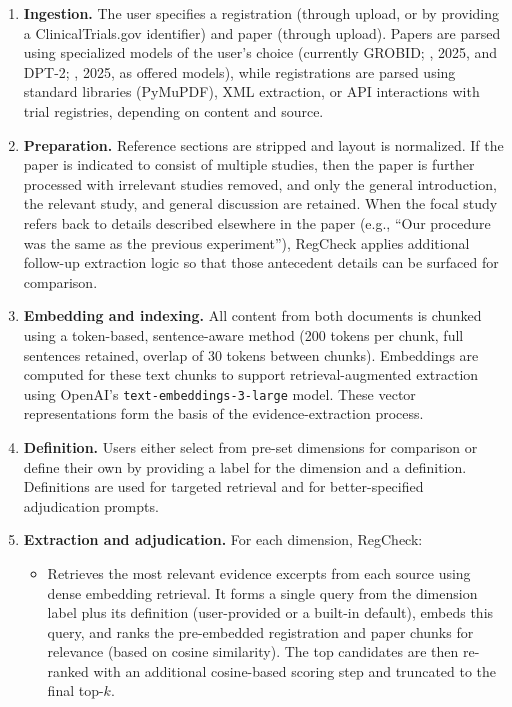 \documentclass{article}
\begin{document}
\begin{enumerate}
\item \textbf{Ingestion.} The user specifies a registration (through upload, or by providing a ClinicalTrials.gov identifier) and paper (through upload). Papers are parsed using specialized models of the user's choice (currently GROBID; \citeauthor{grobid_grobid_2025}, 2025, and DPT-2; \citeauthor{huang_document_2025}, 2025, as offered models), while registrations are parsed using standard libraries (PyMuPDF), XML extraction, or API interactions with trial registries, depending on content and source.
\item \textbf{Preparation.} Reference sections are stripped and layout is normalized. If the paper is indicated to consist of multiple studies, then the paper is further processed with irrelevant studies removed, and only the general introduction, the relevant study, and general discussion are retained. When the focal study refers back to details described elsewhere in the paper (e.g., ``Our procedure was the same as the previous experiment''), RegCheck applies additional follow-up extraction logic so that those antecedent details can be surfaced for comparison.
\item \textbf{Embedding and indexing.} All content from both documents is chunked using a token-based, sentence-aware method (200 tokens per chunk, full sentences retained, overlap of 30 tokens between chunks). Embeddings are computed for these text chunks to support retrieval-augmented extraction using OpenAI's \texttt{text-embeddings-3-large} model. These vector representations form the basis of the evidence-extraction process.
\item \textbf{Definition.} Users either select from pre-set dimensions for comparison or define their own by providing a label for the dimension and a definition. Definitions are used for targeted retrieval and for better-specified adjudication prompts.
\item \textbf{Extraction and adjudication.} For each dimension, RegCheck:
\begin{itemize}
    \item Retrieves the most relevant evidence excerpts from each source using dense embedding retrieval. It forms a single query from the dimension label plus its definition (user-provided or a built-in default), embeds this query, and ranks the pre-embedded registration and paper chunks for relevance (based on cosine similarity). The top candidates are then re-ranked with an additional cosine-based scoring step and truncated to the final top-$k$.

\end{itemize}
\end{enumerate}
\end{document}
